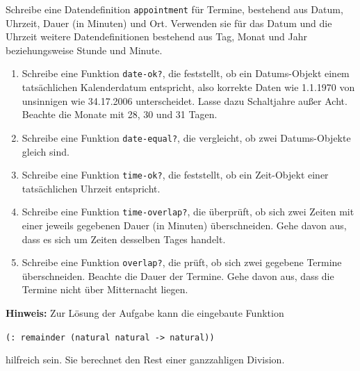 \begin{aufgabe}

  Schreibe eine Datendefinition
  \texttt{appointment} für Termine, bestehend aus Datum, Uhrzeit,
  Dauer (in Minuten) und Ort.  Verwenden sie für das Datum und die
  Uhrzeit weitere Datendefinitionen bestehend aus Tag, Monat und Jahr
  beziehungsweise Stunde und Minute.

  \begin{enumerate}
  \item Schreibe eine Funktion \texttt{date-ok?}, die feststellt,
    ob ein Datums-Objekt einem tatsächlichen Kalenderdatum entspricht,
    also korrekte Daten wie 1.1.1970 von unsinnigen wie 34.17.2006
    unterscheidet. Lasse dazu Schaltjahre außer Acht. Beachte
    die Monate mit 28, 30 und 31 Tagen.
  \item Schreibe eine Funktion \texttt{date-equal?}, die
    vergleicht, ob zwei Datums-Objekte gleich sind.
  \item Schreibe eine Funktion \texttt{time-ok?}, die feststellt,
    ob ein Zeit-Objekt einer tatsächlichen Uhrzeit entspricht.
  \item Schreibe eine Funktion \texttt{time-overlap?}, die
    überprüft, ob sich zwei Zeiten mit einer jeweils gegebenen Dauer
    (in Minuten) überschneiden. Gehe davon aus, dass es sich um
    Zeiten desselben Tages handelt.
  \item Schreibe eine Funktion \texttt{overlap?}, die prüft, ob
    sich zwei gegebene Termine überschneiden. Beachte die Dauer
    der Termine. Gehe davon aus, dass die Termine nicht über
    Mitternacht liegen.
  \end{enumerate}
  \textbf{Hinweis:} Zur Lösung der Aufgabe kann die eingebaute
  Funktion
  \begin{center}
    \texttt{(: remainder (natural natural -> natural))}
  \end{center}

  hilfreich sein. Sie berechnet den Rest einer ganzzahligen Division.

\end{aufgabe}

